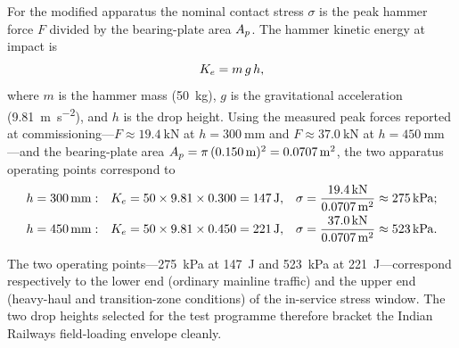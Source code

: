 For the modified apparatus the nominal contact stress $\sigma$ is the peak
hammer force $F$ divided by the bearing-plate area $A_{p}$. The hammer
kinetic energy at impact is
\begin{equation}
    K_{e} = m\,g\,h,
    \label{eq:meth-ke}
\end{equation}
where $m$ is the hammer mass (\SI{50}{\kilogram}), $g$ is the gravitational
acceleration (\SI{9.81}{\metre\per\second\squared}), and $h$ is the drop
height. Using the measured peak forces reported at commissioning---$F
\approx \SI{19.4}{\kilo\newton}$ at $h = \SI{300}{\milli\metre}$ and $F
\approx \SI{37.0}{\kilo\newton}$ at $h = \SI{450}{\milli\metre}$---and the
bearing-plate area $A_{p} = \pi\,(\SI{0.150}{\metre})^{2} =
\SI{0.0707}{\metre\squared}$, the two apparatus operating points correspond
to
\begin{align}
    h &= \SI{300}{\milli\metre}: &
    K_{e} &= 50 \times 9.81 \times 0.300 = \SI{147}{\joule}, &
    \sigma &= \frac{\SI{19.4}{\kilo\newton}}{\SI{0.0707}{\metre\squared}}
        \approx \SI{275}{\kilo\pascal};
        \label{eq:meth-h300}\\
    h &= \SI{450}{\milli\metre}: &
    K_{e} &= 50 \times 9.81 \times 0.450 = \SI{221}{\joule}, &
    \sigma &= \frac{\SI{37.0}{\kilo\newton}}{\SI{0.0707}{\metre\squared}}
        \approx \SI{523}{\kilo\pascal}.
        \label{eq:meth-h450}
\end{align}

\begin{finding}[title=Calibration outcome]
The two operating points---\SI{275}{\kilo\pascal} at \SI{147}{\joule} and
\SI{523}{\kilo\pascal} at \SI{221}{\joule}---correspond respectively to the
lower end (ordinary mainline traffic) and the upper end (heavy-haul and
transition-zone conditions) of the in-service stress window. The two drop
heights selected for the test programme therefore bracket the Indian
Railways field-loading envelope cleanly.
\end{finding}

